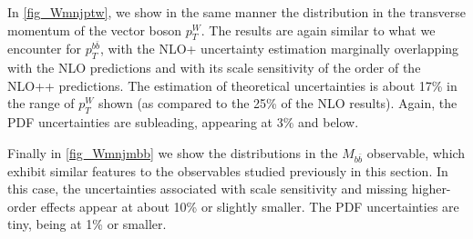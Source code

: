In \cref{fig_Wmnjptw}, we show in the same manner the distribution in the transverse
momentum of the vector boson $p_T^W$. The results are again similar to what we
encounter for $p_T^{b\bar b}$, with the NLO+ uncertainty estimation marginally
overlapping with the NLO predictions and with its scale sensitivity of the order
of the NLO++ predictions. The estimation of theoretical uncertainties is about 17\% in the
range of $p_T^W$ shown (as compared to the 25\% of the NLO results). Again, the PDF uncertainties are
subleading, appearing at 3\% and below.

Finally in \cref{fig_Wmnjmbb} we show the distributions in the $M_{b\bar b}$
observable, which exhibit similar features to the observables
studied previously in this section. In this case, the uncertainties associated with scale
sensitivity and missing higher-order effects appear at about 10\% or slightly
smaller. The PDF uncertainties are tiny, being at 1\% or smaller. 


